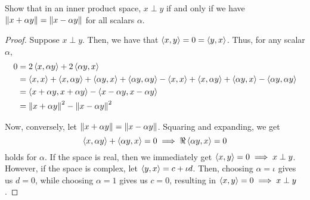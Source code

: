 \begin{question}
    Show that in an inner product space, $x \perp y$ if and only if we have $\left\lVert x + \alpha y \right\rVert = \left\lVert x - \alpha y \right\rVert$ for all scalars $\alpha$.
    \label{section3.2-7}
\end{question}
\begin{proof}
    Suppose $x \perp y$. Then, we have that $\left\langle x , y \right\rangle = 0 = \left\langle y , x \right\rangle$. Thus, for any scalar $\alpha$,
    \begin{align*}
        0 &= 2\left\langle x , \alpha y \right\rangle + 2\left\langle \alpha y , x \right\rangle
        \\
        &= \left\langle x , x \right\rangle + \left\langle x , \alpha y \right\rangle + \left\langle \alpha y , x \right\rangle + \left\langle \alpha y , \alpha y \right\rangle - \left\langle x , x \right\rangle + \left\langle x , \alpha y \right\rangle + \left\langle \alpha y , x \right\rangle - \left\langle \alpha y , \alpha y \right\rangle
        \\
        &= \left\langle x + \alpha y , x + \alpha y \right\rangle - \left\langle x -\alpha y , x - \alpha y \right\rangle
        \\
        &= \left\lVert x + \alpha y \right\rVert^2 - \left\lVert x - \alpha y \right\rVert^2
    \end{align*}

    Now, conversely, let $\left\lVert x + \alpha y \right\rVert = \left\lVert x - \alpha y \right\rVert$. Squaring and expanding, we get
    \[\left\langle x , \alpha y \right\rangle + \left\langle \alpha y , x \right\rangle = 0 \implies \Re \left\langle \alpha y , x \right\rangle = 0\]
    holds for $\alpha$. If the space is real, then we immediately get $\left\langle x , y \right\rangle = 0 \implies x \perp y$. However, if the space is complex, let $\left\langle y , x \right\rangle = c + \iota d$. Then, choosing $\alpha = \iota$ gives us $d = 0$, while choosing $\alpha = 1$ gives us $c = 0$, resulting in $\left\langle x , y \right\rangle = 0 \implies x \perp y$.
\end{proof}

